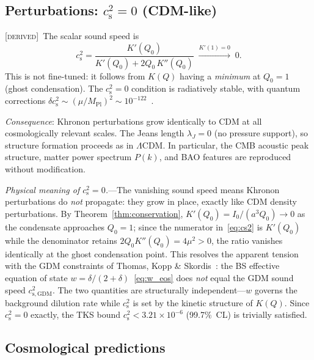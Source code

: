 \documentclass[prd,twocolumn,superscriptaddress,longbibliography,floatfix]{revtex4-2}
\newcommand{\cs}{c_{\mathrm{s}}}
\newcommand{\derived}{\textsc{[derived]}}
\begin{document}
\subsection{Perturbations: $\cs^2 = 0$ (CDM-like)}
\label{sec:perturbations}

\derived\  The scalar sound speed is~\cite{BS2024}
\begin{equation}
\cs^2 = \frac{K'(Q_0)}{K'(Q_0) + 2Q_0\,K''(Q_0)}
\;\xrightarrow{K'(1)=0}\; 0.
\label{eq:cs2}
\end{equation}
This is not fine-tuned: it follows from $K(Q)$ having a
\emph{minimum} at $Q_0 = 1$ (ghost condensation).  The
$\cs^2 = 0$ condition is radiatively stable, with quantum
corrections $\delta\cs^2 \sim (\mu/M_{\mathrm{Pl}})^2
\sim 10^{-122}$~\cite{AHCLM2004}.

\emph{Consequence}: Khronon perturbations grow identically to
CDM at all cosmologically relevant scales.  The Jeans length
$\lambda_J = 0$ (no pressure support), so structure formation
proceeds as in $\Lambda$CDM.  In particular, the CMB acoustic
peak structure, matter power spectrum $P(k)$, and BAO features
are reproduced without modification.

\emph{Physical meaning of $\cs^2 = 0$.}---The vanishing sound
speed means Khronon perturbations do \emph{not} propagate: they
grow in place, exactly like CDM density perturbations.
By Theorem~\ref{thm:conservation}, $K'(Q_0) = I_0/(a^3 Q_0)
\to 0$ as the condensate approaches $Q_0 = 1$; since the
numerator in~\eqref{eq:cs2} is $K'(Q_0)$ while the denominator
retains $2Q_0 K''(Q_0) = 4\mu^2 > 0$, the ratio vanishes
identically at the ghost condensation point.
This resolves the apparent tension with the GDM constraints of
Thomas, Kopp \& Skordis~\cite{TKS2016}: the BS effective equation
of state $w = \delta/(2{+}\delta)$~\eqref{eq:w_eos} does \emph{not}
equal the GDM sound speed $c_{\mathrm{s,GDM}}^2$.  The two quantities
are structurally independent---$w$ governs the background
dilution rate while $\cs^2$ is set by the kinetic structure of
$K(Q)$.  Since $\cs^2 = 0$ exactly, the TKS bound
$\cs^2 < 3.21 \times 10^{-6}$ (99.7\%~CL) is trivially
satisfied.

\subsection{Cosmological predictions}
\end{document}
